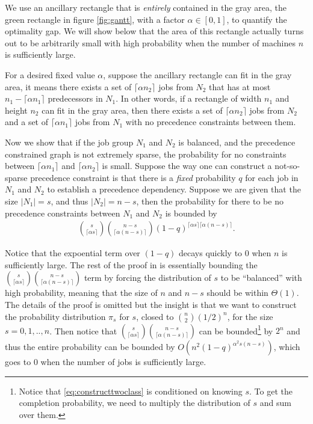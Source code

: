 We use an ancillary rectangle that is \emph{entirely} contained in the gray area, the green rectangle in figure \ref{fig:gantt}, with a factor $\alpha \in [0,1]$, to quantify the optimality gap. We will show below that the area of this rectangle actually turns out to be arbitrarily small with high probability when the number of machines $n$ is sufficiently large. 

For a desired fixed value $\alpha$, suppose the ancillary rectangle can fit in the gray area, it means there exists a set of $\lceil\alpha n_2\rceil$ jobs from $N_2$ that has at most $n_1 - \lceil\alpha n_1\rceil$ predecessors in $N_1$. In other words, if a rectangle of width $n_1$ and height $n_2$ can fit in the gray area, then there exists a set of $\lceil\alpha n_2\rceil$ jobs from $N_2$ and a set of $\lceil\alpha n_1\rceil$  jobs from $N_1$ with no precedence constraints between them.

Now we show that if the job group $N_1$ and $N_2$ is balanced, and the precedence constrained graph is not extremely sparse, the probability for no constraints between $\lceil\alpha n_1\rceil$ and $\lceil\alpha n_2\rceil$ is small. Suppose the way one can construct a not-so-sparse precedence constraint is that there is a \emph{fixed} probability $q$ for each job in $N_1$ and $N_2$ to establish a precedence dependency. Suppose we are given that the size $|N_1| = s$, and thus $|N_2| = n-s$, then the probability for there to be no precedence constraints between $N_1$ and $N_2$ is bounded by
\begin{align}
{s \choose \lceil\alpha s\rceil}{n-s \choose \lceil\alpha (n-s)\rceil}(1-q)^{ \lceil\alpha s\rceil \lceil\alpha (n-s)\rceil}. \label{eq:constructtwoclass}
\end{align}

Notice that the expoential term over $(1-q)$ decays quickly to $0$ when $n$ is sufficiently large. The rest of the proof in \cite{schulz2011near} is essentially bounding the ${s \choose \lceil\alpha s\rceil}{n-s \choose \lceil\alpha (n-s)\rceil}$ term by forcing the distribution of $s$ to be ``balanced'' with high probability, meaning that the size of $n$ and $n-s$ should be within $\Theta(1)$. The details of the proof is omitted but the insight is that we want to construct the probability distribution $\pi_s$ for $s$, closed to ${n \choose 2} (1/2)^n$, for the size $s=0,1,..,n$. Then notice that ${s \choose \lceil\alpha s\rceil}{n-s \choose \lceil\alpha (n-s)\rceil}$ can be bounded\footnote{Notice that \eqref{eq:constructtwoclass} is conditioned on knowing $s$. To get the completion probability, we need to multiply the distribution of $s$ and sum over them.} by $2^n$ and thus the entire probability can be bounded by $O(n^2 (1-q)^{\alpha^2 s(n-s)})$, which goes to 0 when the number of jobs is sufficiently large. 


